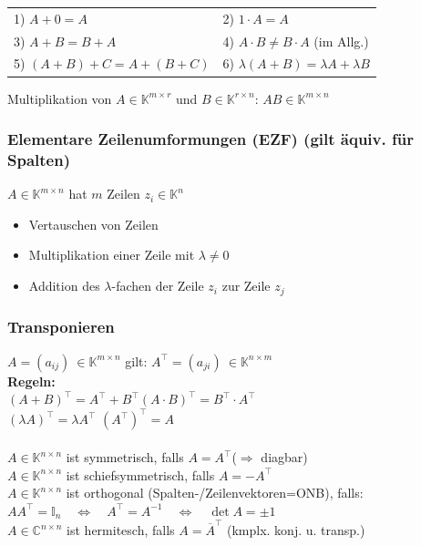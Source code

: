 \documentclass[6pt,a4paper]{scrartcl}
\begin{document}
\begin{multicols*}{4}
\begin{tabular}{ll}	
	1)  $A+0=A$ & 2)  $1 \cdot A=A$ \\
	3)  $A+B=B+A$ & 4) $A \cdot B \ne B \cdot A$ (im Allg.) \\
	5)  $(A+B)+C=A+(B+C)$ & 6) $\lambda (A+B) = \lambda A + \lambda B$\\ 
\end{tabular}
Multiplikation von $A\in \mathbb K^{m\times r}$ und $B\in \mathbb K^{r\times n}$: $AB\in\mathbb K^{m\times n}$

\subsubsection{Elementare Zeilenumformungen (EZF) (gilt äquiv. für Spalten)}
$A \in \mathbb K^{m\times n}$ hat $m$ Zeilen $z_i\in \mathbb K^n$
\begin{itemize}\itemsep0pt
\item Vertauschen von Zeilen
\item Multiplikation einer Zeile mit $\lambda\ne 0$ 
\item Addition des $\lambda$-fachen der Zeile $z_i$ zur Zeile $z_j$
\end{itemize}

\subsubsection{Transponieren}
$A=(a_{ij})\ \in \mathbb K^{m\times n}$ gilt: $A^\top=(a_{ji})\ \in \mathbb K^{n\times m}$\\
\textbf{Regeln:}\\
$(A+B)^\top=A^\top+B^\top$\qquad $(A\cdot B)^\top=B^\top\cdot A^\top$\qquad \\
$(\lambda A)^\top=\lambda A^\top$ \qquad \qquad \qquad $(A^\top)^\top=A$\\
\\
$A\in \mathbb K^{n\times n}$ ist symmetrisch, falls $A=A^\top$\qquad ($\Rightarrow$ diagbar)\\
$A\in \mathbb K^{n\times n}$ ist schiefsymmetrisch, falls $A=-A^\top$\\
$A\in \mathbb K^{n\times n}$ ist orthogonal (Spalten-/Zeilenvektoren=ONB), falls:\\
$AA^\top=\mathbb{I}_n \quad \Leftrightarrow \quad A^\top=A^{-1} \quad \Leftrightarrow \quad \det A=\pm 1$\\
$A\in \mathbb C^{n\times n}$ ist hermitesch, falls $A=\overline{A}^\top$  \quad (kmplx. konj. u. transp.)



\end{multicols*}
\end{document}
